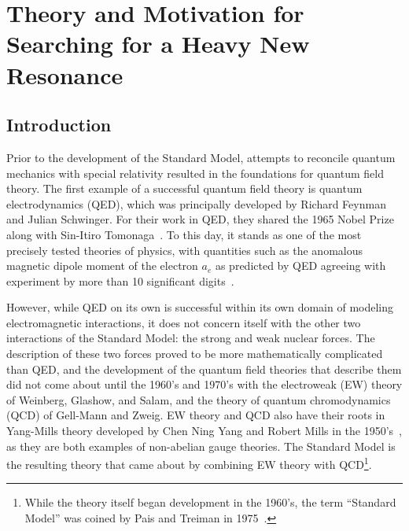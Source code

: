 
\chapter{Theory and Motivation for Searching for a Heavy New Resonance}
\label{chap:theory}

\section{Introduction}

Prior to the development of the Standard Model, attempts to reconcile quantum mechanics with special relativity resulted in the foundations for quantum field theory.
The first example of a successful quantum field theory is quantum electrodynamics (QED), which was principally developed by Richard Feynman and Julian Schwinger.
For their work in QED, they shared the 1965 Nobel Prize along with Sin-Itiro Tomonaga~\cite{NobelPrize:1965-Physics}.
To this day, it stands as one of the most precisely tested theories of physics, with quantities such as the anomalous magnetic dipole moment of the electron $a_e$ as predicted by QED agreeing with experiment by more than 10 significant digits~\cite{Aoyama_2015}.

However, while QED on its own is successful within its own domain of modeling electromagnetic interactions, it does not concern itself with the other two interactions of the Standard Model: the strong and weak nuclear forces.
The description of these two forces proved to be more mathematically complicated than QED, and the development of the quantum field theories that describe them did not come about until the 1960's and 1970's with the electroweak (EW) theory of Weinberg, Glashow, and Salam, and the theory of quantum chromodynamics (QCD) of Gell-Mann and Zweig.
EW theory and QCD also have their roots in Yang-Mills theory developed by Chen Ning Yang and Robert Mills in the 1950's~\cite{1954PhRv...96..191Y}, as they are both examples of non-abelian gauge theories.
The Standard Model is the resulting theory that came about by combining EW theory with QCD\footnote{While the theory itself began development in the 1960's, the term ``Standard Model'' was coined by Pais and Treiman in 1975~\cite{CaoFieldTheory}.}.

